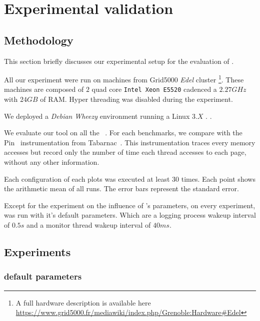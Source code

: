 \section{Experimental validation}
\label{sec:expe}

\subsection{Methodology}
\label{sec:exp-methodo}

This section briefly discusses our experimental setup for the evaluation of
\Moca.

All our experiment were run on  machines from Grid5000 \emph{Edel} cluster
\footnote{A full hardware description is available here
    \url{https://www.grid5000.fr/mediawiki/index.php/Grenoble:Hardware\#Edel}}.
    These machines are composed of $2$ quad core \texttt{Intel Xeon E5520}
    cadenced a $2.27GHz$ with
    $24 GB$ of RAM. Hyper threading was disabled during the experiment.

We deployed a \emph{Debian} \emph{Wheezy} environment running a Linux $3.X$
.
.

We evaluate our tool on all the \NPB~\cite{Jin1999}. For
each benchmarks, we compare \Moca with the Pin~\cite{Luk05Pin} instrumentation
from Tabarnac~\cite{Beniamine15TABARNACRR}. This instrumentation traces every
memory accesses but record only the number of time each thread accesses to
each page, without any other information.

Each configuration of each plots was executed at least $30$ times. Each point
shows the arithmetic mean of all runs. The error bars represent
the standard error.

Except for the experiment on the influence of \Moca's parameters, on every
experiment, \Moca was run with it's default parameters. Which are a logging
process wakeup interval of $0.5s$ and a monitor thread wakeup interval
of $40ms$.


\subsection{Experiments}
\label{sec:expe-ovh}

\subsubsection{\Moca default parameters}


